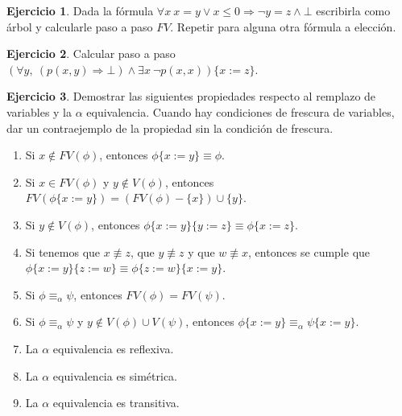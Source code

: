 \documentclass[a4paper,12pt]{book}
\newcommand{\Ra}{\Rightarrow}
\theoremstyle{definition}
\newtheorem{ejercicio}{Ejercicio}
\begin{document}
	
	\begin{ejercicio} Dada la fórmula $\forall x ~x=y\vee x\leq 0\Ra \lnot y=z\wedge \bot$ escribirla como árbol y calcularle paso a paso $FV$. Repetir para alguna otra fórmula a elección.
	\end{ejercicio}
	
	\begin{ejercicio}
		Calcular paso a paso $(\forall y,~(p(x,y)\Ra\bot)\wedge\exists x~\lnot p(x,x))\{x:=z\}$.
	\end{ejercicio}
	
	\begin{ejercicio}
		Demostrar las siguientes propiedades respecto al remplazo de variables y la $\alpha$ equivalencia. Cuando hay condiciones de frescura de variables, dar un contraejemplo de la propiedad sin la condición de frescura.
		\begin{enumerate}\parskip-.5ex
			\item Si $x\not\in FV(\phi)$, entonces $\phi\{x:=y\}\equiv\phi$.
			\item Si $x\in FV(\phi)$ y $y\not\in V(\phi)$, entonces $FV(\phi\{x:=y\})=(FV(\phi)-\{x\})\cup\{y\}$.
			\item Si $y\not\in V(\phi)$, entonces $\phi\{x:=y\}\{y:=z\}\equiv \phi\{x:=z\}$.
			\item Si tenemos que $x\not\equiv z$, que $y\not\equiv z$ y que $w\not\equiv x$, entonces se cumple que\linebreak $\phi\{x:=y\}\{z:=w\}\equiv\phi\{z:=w\}\{x:=y\}$.
			\item Si $\phi\equiv_\alpha\psi$, entonces $FV(\phi)=FV(\psi)$.
			\item 	Si $\phi\equiv_\alpha\psi$ y $y\not\in V(\phi)\cup V(\psi)$, entonces $\phi\{x:=y\}\equiv_\alpha\psi\{x:=y\}$.
			\item La $\alpha$ equivalencia es reflexiva.
			\item La $\alpha$ equivalencia es simétrica.
			\item La $\alpha$ equivalencia es transitiva.
		\end{enumerate}
		
	\end{ejercicio}
	
\end{document}
